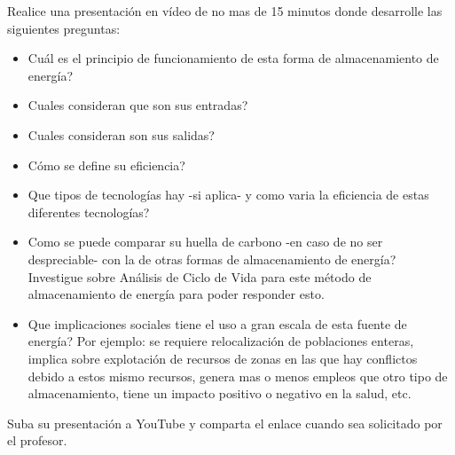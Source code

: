 \documentclass[12pt]{article}
\begin{document}
\noindent Realice una presentación en vídeo de no mas de 15 minutos donde desarrolle las siguientes preguntas: 
\begin{itemize}
    \item Cuál es el principio de funcionamiento de esta forma de almacenamiento de energía?
    \item Cuales consideran que son sus entradas? 
    \item Cuales consideran son sus salidas? 
    \item Cómo se define su eficiencia? 
    \item Que tipos de tecnologías hay -si aplica- y como varia la eficiencia de estas diferentes tecnologías?
    \item Como se puede comparar su huella de carbono -en caso de no ser despreciable- con la de otras formas de almacenamiento de energía? Investigue sobre Análisis de Ciclo de Vida para este método de almacenamiento de energía para poder responder esto. 
    \item Que implicaciones sociales tiene el uso a gran escala de esta fuente de energía? Por ejemplo: se requiere relocalización de poblaciones enteras, implica sobre explotación de recursos de zonas en las que hay conflictos debido a estos mismo recursos, genera mas o menos empleos que otro tipo de almacenamiento, tiene un impacto positivo o negativo en la salud, etc.
\end{itemize}
Suba su presentación a YouTube y comparta el enlace cuando sea solicitado por el profesor.
\end{document}
